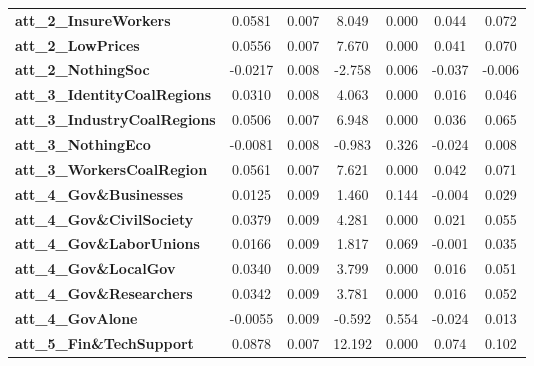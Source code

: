 \begin{center}
\begin{tabular}{lcccccc}
\textbf{att\_2\_InsureWorkers}       &       0.0581  &        0.007     &     8.049  &         0.000        &        0.044    &        0.072     \\
\textbf{att\_2\_LowPrices}           &       0.0556  &        0.007     &     7.670  &         0.000        &        0.041    &        0.070     \\
\textbf{att\_2\_NothingSoc}          &      -0.0217  &        0.008     &    -2.758  &         0.006        &       -0.037    &       -0.006     \\
\textbf{att\_3\_IdentityCoalRegions} &       0.0310  &        0.008     &     4.063  &         0.000        &        0.016    &        0.046     \\
\textbf{att\_3\_IndustryCoalRegions} &       0.0506  &        0.007     &     6.948  &         0.000        &        0.036    &        0.065     \\
\textbf{att\_3\_NothingEco}          &      -0.0081  &        0.008     &    -0.983  &         0.326        &       -0.024    &        0.008     \\
\textbf{att\_3\_WorkersCoalRegion}   &       0.0561  &        0.007     &     7.621  &         0.000        &        0.042    &        0.071     \\
\textbf{att\_4\_Gov\&Businesses}     &       0.0125  &        0.009     &     1.460  &         0.144        &       -0.004    &        0.029     \\
\textbf{att\_4\_Gov\&CivilSociety}   &       0.0379  &        0.009     &     4.281  &         0.000        &        0.021    &        0.055     \\
\textbf{att\_4\_Gov\&LaborUnions}    &       0.0166  &        0.009     &     1.817  &         0.069        &       -0.001    &        0.035     \\
\textbf{att\_4\_Gov\&LocalGov}       &       0.0340  &        0.009     &     3.799  &         0.000        &        0.016    &        0.051     \\
\textbf{att\_4\_Gov\&Researchers}    &       0.0342  &        0.009     &     3.781  &         0.000        &        0.016    &        0.052     \\
\textbf{att\_4\_GovAlone}            &      -0.0055  &        0.009     &    -0.592  &         0.554        &       -0.024    &        0.013     \\
\textbf{att\_5\_Fin\&TechSupport}    &       0.0878  &        0.007     &    12.192  &         0.000        &        0.074    &        0.102     \\

\end{tabular}
\end{center}

